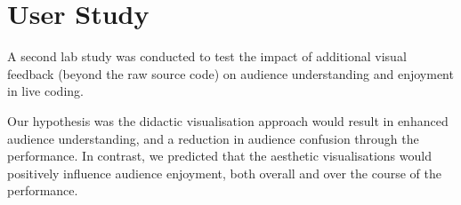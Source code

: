 
\chapter{User Study}
\label{chap:user-study}


A second lab study was conducted to test the impact of additional
visual feedback (beyond the raw source code) on audience understanding
and enjoyment in live coding.

Our hypothesis was the didactic visualisation approach would result in
enhanced audience understanding, and a reduction in audience confusion
through the performance. In contrast, we predicted that the aesthetic
visualisations would positively influence audience enjoyment, both
overall and over the course of the performance.





